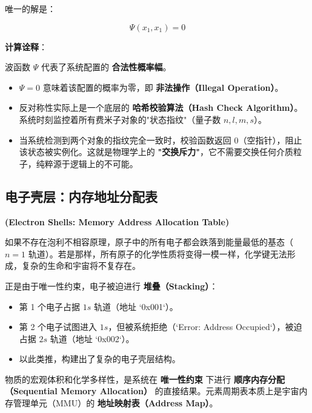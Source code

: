唯一的解是：

\begin{equation}
\Psi(x_1, x_1) = 0
\end{equation}

\textbf{计算诠释}：

波函数 $\Psi$ 代表了系统配置的 \textbf{合法性概率幅}。

\begin{itemize}
\item $\Psi = 0$ 意味着该配置的概率为零，即 \textbf{非法操作（Illegal Operation）}。

\item 反对称性实际上是一个底层的 \textbf{哈希校验算法（Hash Check Algorithm）}。系统时刻监控着所有费米子对象的"状态指纹"（量子数 $n, l, m, s$）。

\item 当系统检测到两个对象的指纹完全一致时，校验函数返回 $0$（空指针），阻止该状态被实例化。这就是物理学上的 \textbf{"交换斥力"}，它不需要交换任何介质粒子，纯粹源于逻辑上的不可能。
\end{itemize}

\subsection{电子壳层：内存地址分配表}

\textbf{(Electron Shells: Memory Address Allocation Table)}

如果不存在泡利不相容原理，原子中的所有电子都会跌落到能量最低的基态（$n=1$ 轨道）。若是那样，所有原子的化学性质将变得一模一样，化学键无法形成，复杂的生命和宇宙将不复存在。

正是由于唯一性约束，电子被迫进行 \textbf{堆叠（Stacking）}：

\begin{itemize}
\item 第 1 个电子占据 $1s$ 轨道（地址 `0x001`）。

\item 第 2 个电子试图进入 $1s$，但被系统拒绝（`Error: Address Occupied`），被迫占据 $2s$ 轨道（地址 `0x002`）。

\item 以此类推，构建出了复杂的电子壳层结构。
\end{itemize}

\begin{theorem}[结构涌现定理]
物质的宏观体积和化学多样性，是系统在 \textbf{唯一性约束} 下进行 \textbf{顺序内存分配（Sequential Memory Allocation）} 的直接结果。元素周期表本质上是宇宙内存管理单元（MMU）的 \textbf{地址映射表（Address Map）}。
\end{theorem}

